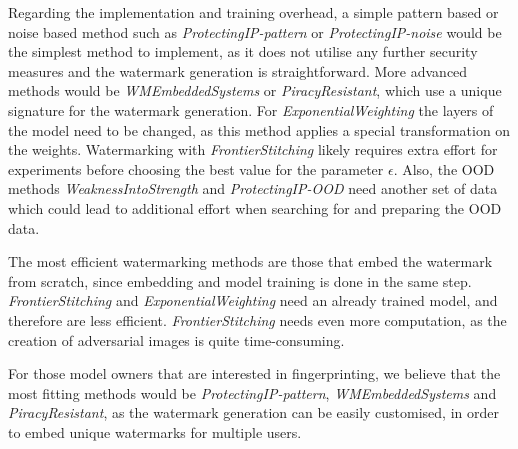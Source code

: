 Regarding the implementation and training overhead, a simple pattern based or noise based method such as \textit{ProtectingIP-pattern} or \textit{ProtectingIP-noise} would be the simplest method to implement, as it does not utilise any further security measures and the watermark generation is straightforward. More advanced methods would be \textit{WMEmbeddedSystems} or \textit{PiracyResistant}, which use a unique signature for the watermark generation. For \textit{ExponentialWeighting} the layers of the model need to be changed, as this method applies a special transformation on the weights. Watermarking with \textit{FrontierStitching} likely requires extra effort for experiments before choosing the best value for the parameter $\epsilon$. Also, the OOD methods \textit{WeaknessIntoStrength} and \textit{ProtectingIP-OOD} need another set of data which could lead to additional effort when searching for and preparing the OOD data.

The most efficient watermarking methods are those that embed the watermark from scratch, since embedding and model training is done in the same step. \textit{FrontierStitching} and \textit{ExponentialWeighting} need an already trained model, and therefore are less efficient. \textit{FrontierStitching} needs even more computation, as the creation of adversarial images is quite time-consuming.

For those model owners that are interested in fingerprinting, we believe that the most fitting methods would be \textit{ProtectingIP-pattern}, \textit{WMEmbeddedSystems} and \textit{PiracyResistant}, as the watermark generation can be easily customised, in order to embed unique watermarks for multiple users.






